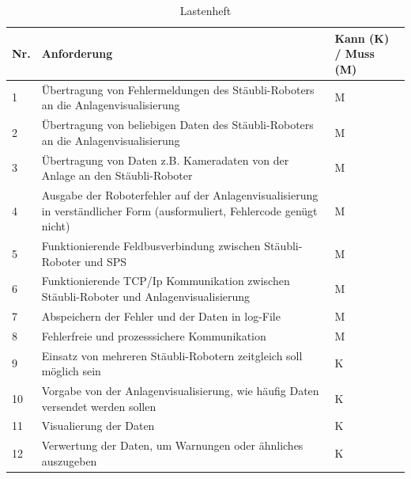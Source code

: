 \documentclass[ a4paper,
                oneside,
                toc=bibliography,
                toc=listof
                ]{scrbook}
\begin{document}
	\begin{longtable}{|p{1cm}|p{10cm}|p{2cm}|}
		\caption{Lastenheft}
		\label{table:Lastenheft}\\
		\hline
		Nr. & Anforderung & Kann (K) / Muss (M) \\ [0.5ex] 
		\hline
		\endhead
		1 & Übertragung von Fehlermeldungen des Stäubli-Roboters an die Anlagenvisualisierung & M  \\ 
		2 & Übertragung von beliebigen Daten des Stäubli-Roboters an die Anlagenvisualisierung & M  \\
		3 & Übertragung von Daten z.B. Kameradaten von der Anlage an den Stäubli-Roboter & M  \\
		4 & Ausgabe der Roboterfehler auf der Anlagenvisualisierung in verständlicher Form (ausformuliert, Fehlercode genügt nicht) & M  \\
		5 & Funktionierende Feldbusverbindung zwischen Stäubli-Roboter und SPS & M  \\
		6 & Funktionierende TCP/Ip Kommunikation zwischen Stäubli-Roboter und Anlagenvisualisierung & M  \\  
		7 & Abspeichern der Fehler und der Daten in log-File & M  \\ 
		8 & Fehlerfreie und prozesssichere Kommunikation & M  \\ 
		\hline
		9 & Einsatz von mehreren Stäubli-Robotern zeitgleich soll möglich sein & K  \\
		10 & Vorgabe von der Anlagenvisualisierung, wie häufig Daten versendet werden sollen & K  \\ 
		11 & Visualierung der Daten & K  \\
		12 & Verwertung der Daten, um Warnungen oder ähnliches auszugeben & K  \\  
		\hline
	\end{longtable}
\end{document}
